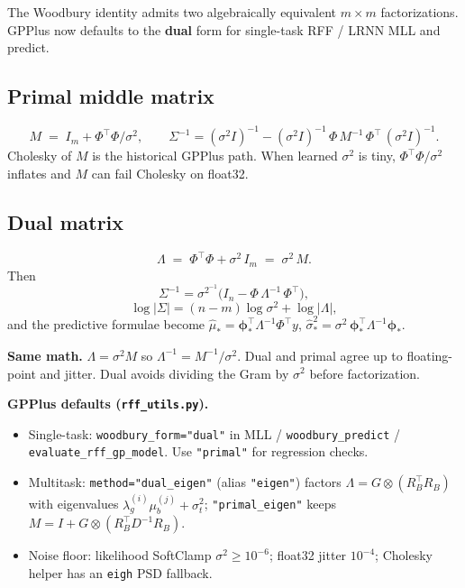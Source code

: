 \documentclass[11pt]{article}
\newcommand{\noise}{\sigma^2}
\newcommand{\Sig}{\Sigma}
\newcommand{\Ph}{\Phi}
\begin{document}
The Woodbury identity admits two algebraically equivalent $m\times m$ factorizations.
GPPlus now defaults to the \textbf{dual} form for single-task RFF / LRNN MLL and predict.

\subsection{Primal middle matrix}

\[
  M \;=\; I_m + \Ph^{\top}\Ph/\noise,
  \qquad
  \Sig^{-1}
  = (\noise I)^{-1}
  - (\noise I)^{-1}\,\Ph\,M^{-1}\,\Ph^{\top}\,(\noise I)^{-1}.
\]
Cholesky of $M$ is the historical GPPlus path. When learned $\noise$ is tiny,
$\Ph^{\top}\Ph/\noise$ inflates and $M$ can fail Cholesky on float32.

\subsection{Dual matrix}

\[
  \Lambda \;=\; \Ph^{\top}\Ph + \noise\,I_m
  \;=\; \noise\,M.
\]
Then
\[
  \Sig^{-1}
  = \noise^{-1}\bigl(I_n - \Ph\,\Lambda^{-1}\,\Ph^{\top}\bigr),
\]
\[
  \log|\Sig|
  = (n-m)\log\noise + \log|\Lambda|,
\]
and the predictive formulae become
$\hat\mu_* = \boldsymbol{\phi}_*^{\top}\Lambda^{-1}\Ph^{\top}y$,
$\hat\sigma_*^2 = \noise\,\boldsymbol{\phi}_*^{\top}\Lambda^{-1}\boldsymbol{\phi}_*$.

\begin{samebox}
\textbf{Same math.}
$\Lambda=\noise M$ so $\Lambda^{-1}=M^{-1}/\noise$. Dual and primal agree up to floating-point
and jitter. Dual avoids dividing the Gram by $\noise$ before factorization.
\end{samebox}

\begin{diffbox}
\textbf{GPPlus defaults (\texttt{rff\_utils.py}).}
\begin{itemize}[nosep]
  \item Single-task: \texttt{woodbury\_form="dual"} in MLL / \texttt{woodbury\_predict} /
        \texttt{evaluate\_rff\_gp\_model}. Use \texttt{"primal"} for regression checks.
  \item Multitask: \texttt{method="dual\_eigen"} (alias \texttt{"eigen"}) factors
        $\Lambda = G\otimes(R_B^{\top}R_B)$ with eigenvalues
        $\lambda_g^{(i)}\mu_b^{(j)}+\sigma_t^{2}$; \texttt{"primal\_eigen"} keeps
        $M=I+G\otimes(R_B^{\top}D^{-1}R_B)$.
  \item Noise floor: likelihood SoftClamp $\sigma^2\ge 10^{-6}$; float32 jitter $10^{-4}$;
        Cholesky helper has an \texttt{eigh} PSD fallback.
\end{itemize}
\end{diffbox}
\end{document}
